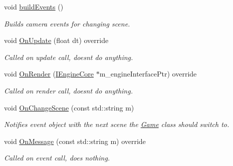 \begin{DoxyCompactItemize}
void \mbox{\hyperlink{class_event_camera_component_a6a2c0f4293f3f7d35296c9e00709ad40}{build\+Events}} ()
\begin{DoxyCompactList}\small\item\em Builds camera events for changing scene. \end{DoxyCompactList}\item 
\mbox{\label{class_event_camera_component_aa834641aeb7cc8ae509f6cc997a44c99}} 
void \mbox{\hyperlink{class_event_camera_component_aa834641aeb7cc8ae509f6cc997a44c99}{On\+Update}} (float dt) override
\begin{DoxyCompactList}\small\item\em Called on update call, doesn\textquotesingle{}t do anything. \end{DoxyCompactList}\item 
\mbox{\label{class_event_camera_component_a88ef296a079e3021d756ef03c56cfe70}} 
void \mbox{\hyperlink{class_event_camera_component_a88ef296a079e3021d756ef03c56cfe70}{On\+Render}} (\mbox{\hyperlink{class_i_engine_core}{I\+Engine\+Core}} $\ast$m\+\_\+engine\+Interface\+Ptr) override
\begin{DoxyCompactList}\small\item\em Called on render call, doesn\textquotesingle{}t do anything. \end{DoxyCompactList}\item 
\mbox{\label{class_event_camera_component_a2eb23cc4f6598a99afacf89d999476e2}} 
void \mbox{\hyperlink{class_event_camera_component_a2eb23cc4f6598a99afacf89d999476e2}{On\+Change\+Scene}} (const std\+::string m)
\begin{DoxyCompactList}\small\item\em Notifies event object with the next scene the \mbox{\hyperlink{class_game}{Game}} class should switch to. \end{DoxyCompactList}\item 
\mbox{\label{class_event_camera_component_a0de9c713b1c9cbb98b8528080fb81adb}} 
void \mbox{\hyperlink{class_event_camera_component_a0de9c713b1c9cbb98b8528080fb81adb}{On\+Message}} (const std\+::string m) override
\begin{DoxyCompactList}\small\item\em Called on event call, does nothing. \end{DoxyCompactList}\item 

\end{DoxyCompactItemize}
